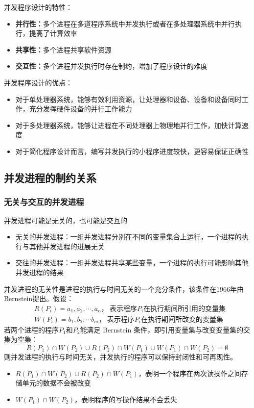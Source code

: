 \documentclass[cs4size,a4paper,10pt]{ctexart}
\begin{document}
	并发程序设计的特性：
	\begin{itemize}
		\item \textbf{并行性：}多个进程在多道程序系统中并发执行或者在多处理器系统中并行执行，提高了计算效率
		\item \textbf{共享性：}多个进程共享软件资源
		\item \textbf{交互性：}多个进程并发执行时存在制约，增加了程序设计的难度
	\end{itemize}

	并发程序设计的优点：
	\begin{itemize}
		\item 对于单处理器系统，能够有效利用资源，让处理器和设备、设备和设备同时工作，充分发挥硬件设备的并行工作能力
		\item 对于多处理器系统，能够让进程在不同处理器上物理地并行工作，加快计算速度
		\item 对于简化程序设计而言，编写并发执行的小程序进度较快，更容易保证正确性
	\end{itemize}

	\subsection{并发进程的制约关系}

	\subsubsection{无关与交互的并发进程}
	并发进程可能是无关的，也可能是交互的
	\begin{itemize}
		\item 无关的并发进程：一组并发进程分别在不同的变量集合上运行，一个进程的执行与其他并发进程的进展无关
		\item 交往的并发进程：一组并发进程共享某些变量，一个进程的执行可能影响其他并发进程的结果
	\end{itemize}

	并发进程的无关性是进程的执行与时间无关的一个充分条件，该条件在1966年由Bernstein提出。假设：
	$$
	\begin{aligned}
		& R(P_i)={a_{1},a_{2},\cdots, a_{n}}，\ \mbox{表示程序}P_i\mbox{在执行期间所引用的变量集} \\
		& W(P_i)={b_{1},b_{2},\cdots b_{m}}，\ \mbox{表示程序}P_i\mbox{在执行期间所改变的变量集}
	\end{aligned}
	$$
	若两个进程的程序$P_1$和$P_2$能满足 Bernstein 条件，即引用变量集与改变变量集的交集为空集：
	$$R(P_1)\cap W(P_2) \cup R(P_2) \cap W(P_1) \cup W(P_1) \cap W(P_2) = \emptyset$$
	则并发进程的执行与时间无关，并发执行的程序可以保持封闭性和可再现性。
	\begin{itemize}
		\item $R(P_1)\cap W(P_2) \cup R(P_2) \cap W(P_1)$，表明一个程序在两次读操作之间存储单元的数据不会被改变
		\item $W(P_1) \cap W(P_2)$，表明程序的写操作结果不会丢失
	\end{itemize}
\end{document}
